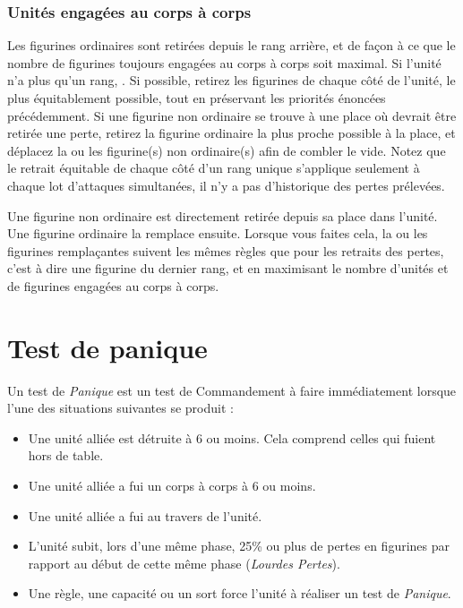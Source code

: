 \subsubsection*{Unités engagées au corps à corps}

Les figurines ordinaires sont retirées depuis le rang arrière, et de façon à ce que le nombre de figurines toujours engagées au corps à corps soit maximal.
Si l'unité n'a plus qu'un rang, . Si possible, retirez les figurines de chaque côté de l'unité, le plus équitablement possible, tout en préservant les priorités énoncées précédemment. Si une figurine non ordinaire se trouve à une place où devrait être retirée une perte, retirez la figurine ordinaire la plus proche possible à la place, et déplacez la ou les figurine(s) non ordinaire(s) afin de combler le vide. Notez que le retrait équitable de chaque côté d'un rang unique s'applique seulement à chaque lot d'attaques simultanées, il n'y a pas d'historique des pertes prélevées.

Une figurine non ordinaire est directement retirée depuis sa place dans l'unité. Une figurine ordinaire la remplace ensuite. Lorsque vous faites cela, la ou les figurines remplaçantes suivent les mêmes règles que pour les retraits des pertes, c'est à dire une figurine du dernier rang, et en maximisant le nombre d'unités et de figurines engagées au corps à corps.

\section{Test de panique}

Un test de \emph{Panique} est un test de Commandement à faire immédiatement lorsque l'une des situations suivantes se produit :
\begin{itemize}[label={-}]
\item Une unité alliée est détruite à \unit{6}{\pouce} ou moins. Cela comprend celles qui fuient hors de table.
\item Une unité alliée a fui un corps à corps à \unit{6}{\pouce} ou moins.
\item Une unité alliée a fui au travers de l'unité.
\item L'unité subit, lors d'une même phase, 25\% ou plus de pertes en figurines par rapport au début de cette même phase (\emph{Lourdes Pertes}).
\item Une règle, une capacité ou un sort force l'unité à réaliser un test de \emph{Panique}.
\end{itemize}

